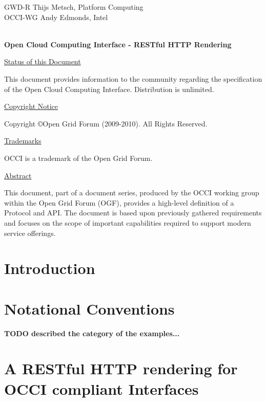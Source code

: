 \documentclass[10pt,a4paper]{article}
\begin{document}
\thispagestyle{empty}

GWD-R \hfill Thijs Metsch, Platform Computing\\
OCCI-WG \hfill Andy Edmonds, Intel\\
\\

\vspace*{0.5in}

\begin{Large}
\textbf{Open Cloud Computing Interface - RESTful HTTP Rendering}
\end{Large}

\vspace*{0.5in}

\underline{Status of this Document}

This document provides information to the community regarding the
specification of the Open Cloud Computing Interface. Distribution is
unlimited.

\underline{Copyright Notice}

Copyright \copyright Open Grid Forum (2009-2010). All Rights Reserved.

\underline{Trademarks}

OCCI is a trademark of the Open Grid Forum.

\underline{Abstract}

This document, part of a document series, produced by the OCCI working
group within the Open Grid Forum (OGF), provides a high-level
definition of a Protocol and API. The document is based upon
previously gathered requirements and focuses on the scope of important
capabilities required to support modern service offerings.

\newpage
\tableofcontents
\newpage

\section{Introduction}


\section{Notational Conventions}


\textbf{TODO described the category of the examples...}

\section{A RESTful HTTP rendering for OCCI compliant Interfaces}
\end{document}
